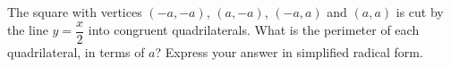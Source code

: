 The square with vertices $(-a,-a)$, $(a,-a)$, $(-a,a)$ and $(a,a)$ is cut by the line $y=\dfrac {x}{2}$ into congruent quadrilaterals. What is the perimeter of each quadrilateral, in terms of $a$? Express your answer in simplified radical form.
